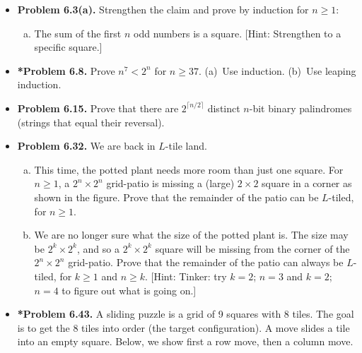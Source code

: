 \documentclass[11pt]{article}
\begin{document}
\begin{itemize}
\vspace{0.1in}

\item \textbf{Problem 6.3(a).}
  Strengthen the claim and prove by induction for $n\ge 1$:
  \begin{enumerate}[(a)]
  \item The sum of the first $n$ odd numbers is a square.
    [Hint: Strengthen to a specific square.]
  \end{enumerate}

\vspace{0.1in}

\item \textbf{*Problem 6.8.}
  Prove $n^7<2^n$ for $n\ge 37$.
  (a)~Use induction.
  (b)~Use leaping induction.

\vspace{0.1in}

\item \textbf{Problem 6.15.}
  Prove that there are $2^{\lceil n/2\rceil}$ distinct $n$-bit binary palindromes
  (strings that equal their reversal).

\vspace{0.1in}

\item \textbf{Problem 6.32.}
  We are back in $L$-tile land.
  \begin{enumerate}[(a)]
  \item This time, the potted plant needs more room than just one square.
    For $n\ge 1$, a $2^n\times 2^n$ grid-patio is missing a (large) $2\times 2$ square
    in a corner as shown in the figure.
    Prove that the remainder of the patio can be $L$-tiled, for $n\ge 1$.
  \item We are no longer sure what the size of the potted plant is.
    The size may be $2^k\times 2^k$, and so a $2^k\times 2^k$ square
    will be missing from the corner of the $2^n\times 2^n$ grid-patio.
    Prove that the remainder of the patio can always be $L$-tiled,
    for $k\ge 1$ and $n\ge k$.
    [Hint: Tinker: try $k=2$; $n=3$ and $k=2$; $n=4$ to figure out what is going on.]
  \end{enumerate}

\newpage

\item \textbf{*Problem 6.43.}
  A sliding puzzle is a grid of 9 squares with 8 tiles.
  The goal is to get the 8 tiles into order (the target configuration).
  A move slides a tile into an empty square.
  Below, we show first a row move, then a column move.


\end{itemize}
\end{document}
